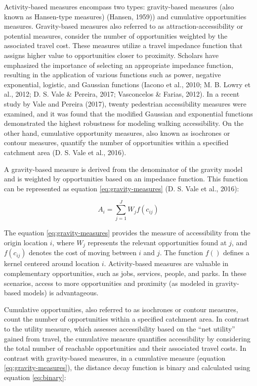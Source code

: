 \documentclass[
11pt, %
oneside, %
english, %
singlespacing, %
]{macthesis} %
\begin{document}
Activity-based measures encompass two types: gravity-based measures (also known as Hansen-type measures) (Hansen, 1959)) and cumulative opportunities measures. Gravity-based measures also referred to as attraction-accessibility or potential measures, consider the number of opportunities weighted by the associated travel cost. These measures utilize a travel impedance function that assigns higher value to opportunities closer to proximity. Scholars have emphasized the importance of selecting an appropriate impedance function, resulting in the application of various functions such as power, negative exponential, logistic, and Gaussian functions (Iacono et al., 2010; M. B. Lowry et al., 2012; D. S. Vale \& Pereira, 2017; Vasconcelos \& Farias, 2012). In a recent study by Vale and Pereira (2017), twenty pedestrian accessibility measures were examined, and it was found that the modified Gaussian and exponential functions demonstrated the highest robustness for modeling walking accessibility. On the other hand, cumulative opportunity measures, also known as isochrones or contour measures, quantify the number of opportunities within a specified catchment area (D. S. Vale et al., 2016).

A gravity-based measure is derived from the denominator of the gravity model and is weighted by opportunities based on an impedance function. This function can be represented as equation \ref{eq:gravity-measures} (D. S. Vale et al., 2016):

\begin{equation}
A_i = \sum_{j = 1}^{J} W_{j} f(c_{ij})
\label{eq:gravity-measures}
\end{equation}

The equation \ref{eq:gravity-measures} provides the measure of accessibility from the origin location \(i\), where \(W_j\) represents the relevant opportunities found at \(j\), and \(f(c_{ij})\) denotes the cost of moving between \(i\) and \(j\). The function \(f()\) defines a kernel centered around location \(i\). Activity-based measures are valuable in complementary opportunities, such as jobs, services, people, and parks. In these scenarios, access to more opportunities and proximity (as modeled in gravity-based models) is advantageous.

Cumulative opportunities, also referred to as isochrones or contour measures, count the number of opportunities within a specified catchment area. In contrast to the utility measure, which assesses accessibility based on the ``net utility'' gained from travel, the cumulative measure quantifies accessibility by considering the total number of reachable opportunities and their associated travel costs. In contrast with gravity-based measures, in a cumulative measure (equation \ref{eq:gravity-measures}), the distance decay function is binary and calculated using equation \ref{eq:binary}:
\end{document}
